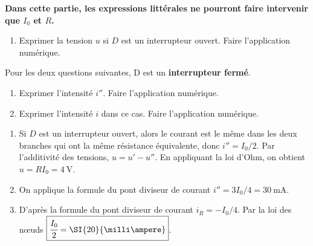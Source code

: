 \documentclass[a4paper, 10pt, garamond, oneside]{book}
\begin{document}
{	\begin{center}
		\bfseries
		Dans cette partie, les expressions littérales
		ne pourront faire intervenir que $I_0$ et $R$.
	\end{center}
	\begin{enumerate}[resume]
		\item
		      Exprimer la tension $u$ si 	$D$ est un interrupteur ouvert.
		      Faire l'application numérique.
	\end{enumerate}
	Pour les deux questions suivantes, D est un \textbf{interrupteur fermé}.
	\begin{enumerate}[resume]
		\item
		      Exprimer l'intensité $i''$. Faire l'application numérique.
		\item
		      Exprimer l'intensité $i$ dans ce cas. Faire l'application numérique.
	\end{enumerate}
}{
	\begin{enumerate}[resume]
		\item
		      \noindent
		      \begin{minipage}{0.4\linewidth}
			      Si $D$ est un interrupteur ouvert, alors le courant est le même
			      dans les deux branches qui ont la même résistance équivalente,
			      donc $i''=I_0/2$.
			      Par l'additivité des tensions, $u=u'-u''$.
			      En appliquant la loi d'Ohm, on obtient
			      $\boxed{u=RI_0=\SI{4}{\volt}}$.
		      \end{minipage}
		      \begin{minipage}{0.6\linewidth}
			      \begin{center}
			      \end{center}
		      \end{minipage}
		\item
		      On applique la formule du pont diviseur de courant
		      $\boxed{i''=3I_0/4=\SI{30}{\milli\ampere}}$.
		\item
		      \noindent
		      \begin{minipage}{0.4\linewidth}
			      D'après la formule du pont diviseur de courant $i_R=-I_0/4$. Par
			      la loi des nœuds $\boxed{\cfrac{I_0}{2}=\SI{20}{\milli\ampere}}$.
		      \end{minipage}
		      \begin{minipage}{0.6\linewidth}
			      \begin{center}
			      \end{center}
		      \end{minipage}
	\end{enumerate}
}
\end{document}
